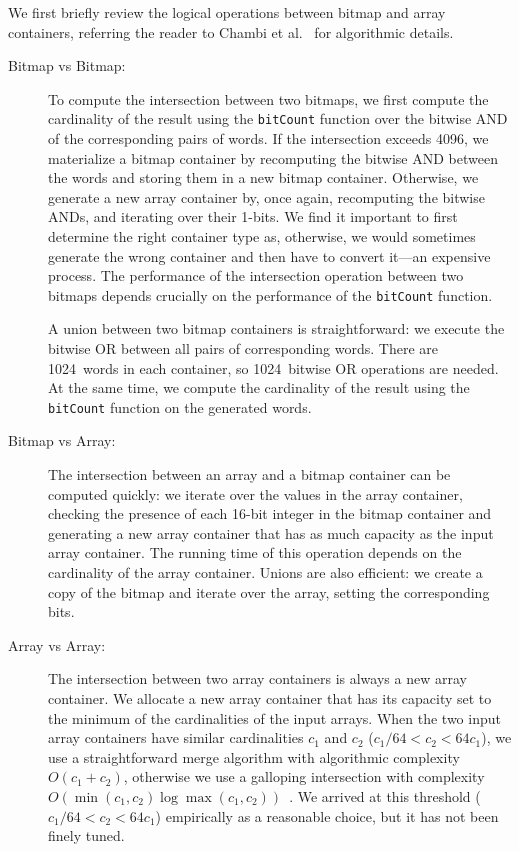 \documentclass[times]{speauth}
\begin{document}
We first briefly review the logical operations between bitmap and array containers, referring the reader to Chambi et al.~\cite{SPE:SPE2325} for algorithmic details.
\begin{description}
\item [Bitmap vs Bitmap:] To compute the intersection between two bitmaps, we first
compute the cardinality of the result using the \texttt{bitCount} function over the bitwise AND of the corresponding pairs of words. If the intersection exceeds \num{4096}, we materialize a bitmap container  by recomputing the bitwise AND between the words and storing them in a new bitmap container. Otherwise, we generate a new array container by, once again, recomputing the bitwise ANDs, and iterating over their 1-bits.
 We find it important  to first determine the right
container type as, otherwise, we would sometimes generate the wrong container and then have to convert it---an expensive process. The performance of the intersection operation between two bitmaps depends crucially on the performance of the \texttt{bitCount} function.

A union between two bitmap containers is straightforward: we execute the bitwise OR between all pairs of corresponding words. There are \num{1024}~words in each container, so \num{1024}~bitwise OR operations are needed. At the same time, we compute the cardinality of the result using the \texttt{bitCount} function on the generated words.

\item [Bitmap vs Array:] The intersection between an array and a bitmap container  can be computed quickly: we iterate over the values in the array container, checking the presence of each 16-bit integer in the bitmap container and generating a new array container that has as much capacity as the input array container. The running time of this operation depends on the cardinality of the array container.  Unions are also efficient: we create a copy of the bitmap and  iterate over the array, setting the corresponding bits.

\item [Array vs Array:] The intersection between two array containers is always a new array container. We allocate a new array container that has its capacity set to the minimum of the cardinalities of the input arrays.  When the two input array containers have similar cardinalities $c_1$ and $c_2$ ($c_1/64 < c_2 < 64 c_1$),
 we use a straightforward merge algorithm with algorithmic complexity $O(c_1 + c_2)$, otherwise we use a galloping intersection  with complexity $O(\min(c_1,c_2) \log \max(c_1,c_2))$~\cite{bentley1976almost}. We arrived at this threshold ($c_1/64 < c_2 < 64 c_1$) empirically as a reasonable choice, but it has not been finely tuned.


\end{description}
\end{document}
